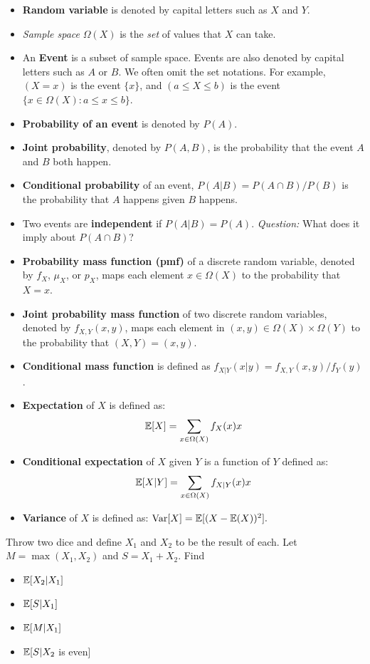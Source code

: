 \documentclass{discussion}
\begin{document}
\begin{itemize}
\item \textbf{Random variable} is denoted by capital letters such as $X$ and $Y$.
\item \textit{Sample space} $\Omega(X)$ is the \textit{set} of values that $X$ can take.
\item An \textbf{Event} is a subset of sample space. Events are also denoted by capital letters such as $A$ or $B$. We often omit the set notations. For example, $(X = x)$ is the event $\{x\}$, and $(a \leq X \leq b)$ is the event $\{x \in \Omega(X): a \leq x \leq b\}$.
\item \textbf{Probability of an event} is denoted by $P(A)$.
\item \textbf{Joint probability}, denoted by $P(A,B)$, is the probability that the event $A$ and $B$ both happen.
\item \textbf{Conditional probability} of an event, $P(A | B) = P(A \cap B) / P(B)$ is the probability that $A$ happens given $B$ happens.
\item Two events are \textbf{independent} if $P(A | B) = P(A)$. \textit{Question:} What does it imply about $P(A \cap B)$?
\item \textbf{Probability mass function (pmf)} of a discrete random variable, denoted by $f_X$, $\mu_X$, or $p_X$, maps each element $x \in \Omega(X)$ to the probability that $X = x$.
\item \textbf{Joint probability mass function} of two discrete random variables, denoted by $f_{X,Y}(x, y)$, maps each element in $(x,y) \in \Omega(X) \times \Omega(Y)$ to the probability that $(X,Y) = (x,y)$.
\item \textbf{Conditional mass function} is defined as $f_{X|Y}(x | y) = f_{X,Y}(x,y) / f_Y(y)$.
\item \textbf{Expectation} of $X$ is defined as:
\[\mathbb{E}[X] = \sum_{x \in \Omega(X)} f_X(x) x \]
\item \textbf{Conditional expectation} of $X$ given $Y$ is a function of $Y$ defined as:
\[\mathbb{E}[X | Y] = \sum_{x \in \Omega(X)} f_{X | Y}(x) x \]
\item \textbf{Variance} of $X$ is defined as: $\mathrm{Var}[X] = \mathbb{E}[(X - \mathbb{E}(X))^2].$
\end{itemize}

\vspace{1em}

\begin{exercise}
Throw two dice and define $X_1$ and $X_2$ to be the result of each. Let $M = \max(X_1, X_2)$ and $S = X_1 + X_2$. Find 
\begin{itemize}
\item $\mathbb{E}[X_2 | X_1]$
\item $\mathbb{E}[S | X_1]$
\item $\mathbb{E}[M | X_1]$
\item $\mathbb{E}[S | X_2$ is even]
\end{itemize}
\end{exercise}
\end{document}
